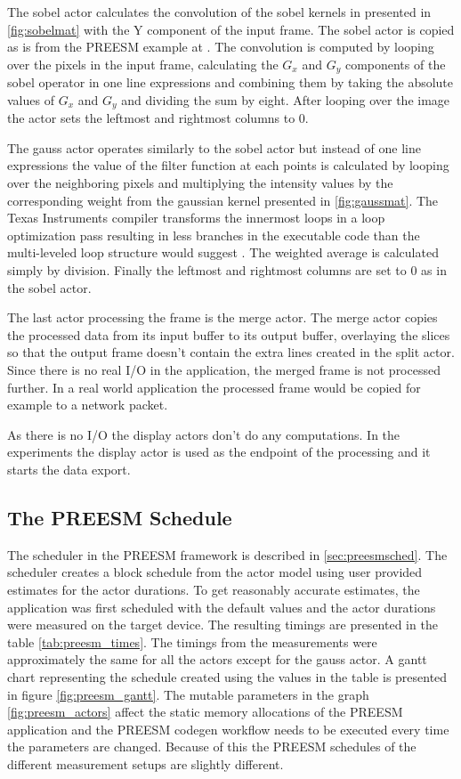 The sobel actor calculates the convolution of the sobel kernels in presented in \ref{fig:sobelmat} with the Y component of the input frame. The sobel actor is copied as is from the PREESM example at \cite{preesmtut}. The convolution is computed by looping over the pixels in the input frame, calculating the $G_{x}$ and $G_{y}$ components of the sobel operator in one line expressions and combining them by taking the absolute values of $G_{x}$ and $G_{y}$ and dividing the sum by eight. After looping over the image the actor sets the leftmost and rightmost columns to 0.

The gauss actor operates similarly to the sobel actor but instead of one line expressions the value of the filter function at each points is calculated by looping over the neighboring pixels and multiplying the intensity values by the corresponding weight from the gaussian kernel presented in \ref{fig:gaussmat}. The Texas Instruments compiler transforms the innermost loops in a loop optimization pass resulting in less branches in the executable code than the multi-leveled loop structure would suggest . The weighted average is calculated simply by division. Finally the leftmost and rightmost columns are set to 0 as in the sobel actor.

The last actor processing the frame is the merge actor. The merge actor copies the processed data from its input buffer to its output buffer, overlaying the slices so that the output frame doesn't contain the extra lines created in the split actor. Since there is no real I/O in the application, the merged frame is not processed further. In a real world application the processed frame would be copied for example to a network packet.

As there is no I/O the display actors don't do any computations. In the experiments the display actor is used as the endpoint of the processing and it starts the data export. 

\subsection{The PREESM Schedule}
\label{subsec:preesmsched}
The scheduler in the PREESM framework is described in \ref{sec:preesmsched}. The scheduler creates a block schedule from the actor model using user provided estimates for the actor durations. To get reasonably accurate estimates, the application was first scheduled with the default values and the actor durations were measured on the target device. The resulting timings are presented in the table \ref{tab:preesm_times}. The timings from the measurements were approximately the same for all the actors except for the gauss actor. A gantt chart representing the schedule created using the values in the table is presented in figure \ref{fig:preesm_gantt}. The mutable parameters in the graph \ref{fig:preesm_actors} affect the static memory allocations of the PREESM application and the PREESM codegen workflow needs to be executed every time the parameters are changed. Because of this the PREESM schedules of the different measurement setups are slightly different.

